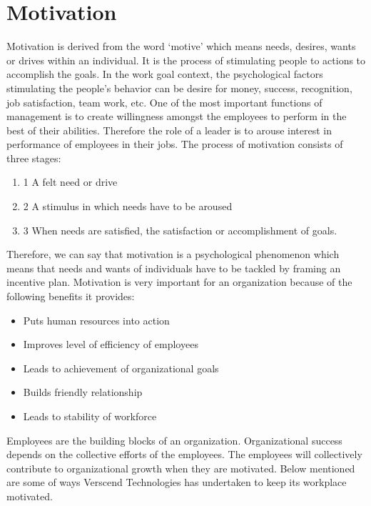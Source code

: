 \section{Motivation}
Motivation is derived from the word ‘motive’ which means needs, desires, wants or drives within an
individual. It is the process of stimulating people to actions to accomplish the goals. In the work goal context,
the psychological factors stimulating the people’s behavior can be desire for money, success, recognition, job
satisfaction, team work, etc. One of the most important functions of management is to create willingness
amongst the employees to perform in the best of their abilities. Therefore the role of a leader is to arouse
interest in performance of employees in their jobs. The process of motivation consists of three stages:
\begin{enumerate}
\item1 A felt need or drive
\item2 A stimulus in which needs have to be aroused
\item3 When needs are satisfied, the satisfaction or accomplishment of goals.
\end{enumerate}
Therefore, we can say that motivation is a psychological phenomenon which means that needs and wants of
individuals have to be tackled by framing an incentive plan.
Motivation is very important for an organization because of the following benefits it provides:
\begin{itemize}
\item Puts human resources into action
\item Improves level of efficiency of employees
\item Leads to achievement of organizational goals
\item Builds friendly relationship
\item Leads to stability of workforce
\end{itemize}
Employees are the building blocks of an organization. Organizational success depends on the collective efforts
of the employees. The employees will collectively contribute to organizational growth when they are
motivated. Below mentioned are some of ways Verscend Technologies has undertaken to keep its
workplace motivated.
